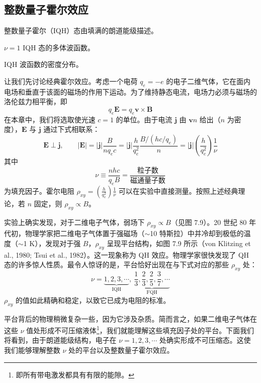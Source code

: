 \subsection{整数量子霍尔效应}

\begin{keypoints}
\item 整数量子霍尔（IQH）态由填满的朗道能级描述。
\item $\nu=1$ IQH 态的多体波函数。
\item IQH 波函数的密度分布。
\end{keypoints}

让我们先讨论经典霍尔效应。考虑一个电荷 $q_e=-e$ 的电子二维气体，它在面内电场和垂直于该面的磁场的作用下运动。为了维持静态电流，电场力必须与磁场的洛伦兹力相平衡，即
\begin{equation*}
q_e\pmb{E} = q_e\pmb{v}\times\pmb{B}
\end{equation*}
在本章中，我们将选取使光速 $c=1$ 的单位。由于电流 $\pmb{j}$ 由 $\pmb{v}n$ 给出（$n$ 为密度），$\pmb{E}$ 与 $\pmb{j}$ 通过下式相联系：
\begin{equation*}
\pmb{E}\perp\pmb{j}, \qquad |\pmb{E}| = |\pmb{j}|\frac{B}{nq_ec} = |\pmb{j}|\frac{h}{q_e^2}\frac{B/(hc/q_e)}{n} = |\pmb{j}|\left(\frac{h}{q_e^2}\right)\frac{1}{\nu}
\end{equation*}
其中
\begin{equation*}
\nu \equiv \frac{nhc}{q_eB} = \frac{\text{粒子数}}{\text{磁通量子数}}
\end{equation*}
为填充因子。霍尔电阻 $\rho_{xy}=\left(\frac{h}{q_e^2}\right)\frac{1}{\nu}$ 可以在实验中直接测量。按照上述经典理论，若 $n$ 固定，则 $\rho_{xy}\propto B$。

实验上确实发现，对于二维电子气体，弱场下 $\rho_{xy}\propto B$（见图 7.9）。20 世纪 80 年代初，物理学家把二维电子气体置于强磁场（$\sim$10 特斯拉）中并冷却到极低的温度（$\sim$1 K），发现对于强 $B$，$\rho_{xy}$ 呈现平台结构，如图 7.9 所示（von Klitzing et al., 1980; Tsui et al., 1982）。这一现象称为 QH 效应。物理学家很快发现了 QH 态的许多惊人性质。最令人惊讶的是，平台恰好出现在与下式对应的那些 $\rho_{xy}$ 处：
\begin{equation*}
\nu = \underbrace{1, 2, 3, \cdots}_{\text{IQH}},\ \underbrace{\frac{1}{3}, \frac{2}{3}, \frac{2}{5}, \frac{3}{7}, \cdots}_{\text{FQH}}
\end{equation*}
$\rho_{xy}$ 的值如此精确和稳定，以致它已成为电阻的标准。

平台背后的物理稍微复杂一些，因为它涉及杂质。简而言之，如果二维电子气体在这些 $\nu$ 值处形成不可压缩液体\footnote{即所有带电激发都具有有限的能隙。}，我们就能理解这些填充因子处的平台。下面我们将看到，由于朗道能级结构，电子在 $\nu=1,2,3,\cdots$ 处确实形成不可压缩态。这使我们能够理解整数 $\nu$ 处的平台以及整数量子霍尔效应。

